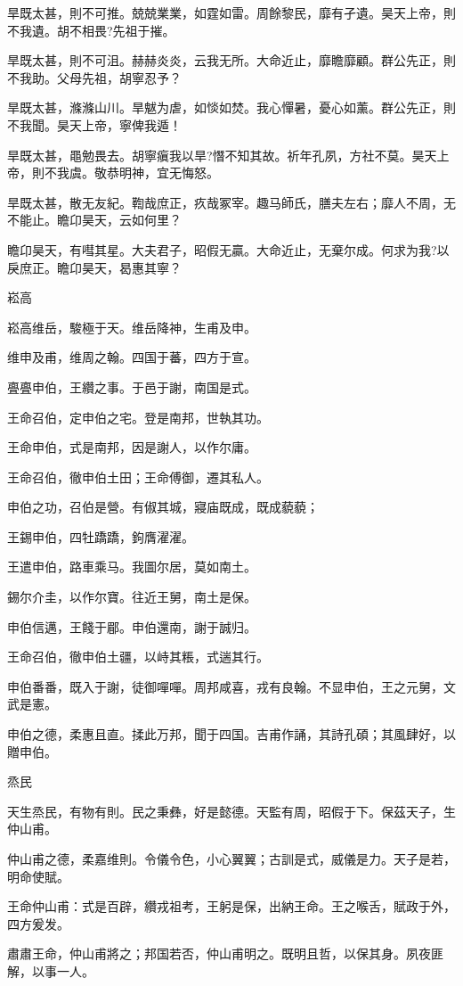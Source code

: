 旱既太甚，則不可推。兢兢業業，如霆如雷。周餘黎民，靡有孑遺。昊天上帝，則不我遺。胡不相畏?先祖于摧。

旱既太甚，則不可沮。赫赫炎炎，云我无所。大命近止，靡瞻靡顧。群公先正，則不我助。父母先祖，胡寧忍予？

旱既太甚，滌滌山川。旱魃为虐，如惔如焚。我心憚暑，憂心如薰。群公先正，則不我聞。昊天上帝，寧俾我遁！

旱既太甚，黽勉畏去。胡寧瘨我以旱?憯不知其故。祈年孔夙，方社不莫。昊天上帝，則不我虞。敬恭明神，宜无悔怒。

旱既太甚，散无友紀。鞫哉庶正，疚哉冢宰。趣马師氏，膳夫左右；靡人不周，无不能止。瞻卬昊天，云如何里？

瞻卬昊天，有嘒其星。大夫君子，昭假无贏。大命近止，无棄尔成。何求为我?以戾庶正。瞻卬昊天，曷惠其寧？

崧高

崧高维岳，駿極于天。维岳降神，生甫及申。

维申及甫，维周之翰。四国于蕃，四方于宣。

亹亹申伯，王纘之事。于邑于謝，南国是式。

王命召伯，定申伯之宅。登是南邦，世執其功。

王命申伯，式是南邦，因是謝人，以作尔庸。

王命召伯，徹申伯土田；王命傅御，遷其私人。

申伯之功，召伯是營。有俶其城，寢庙既成，既成藐藐；

王錫申伯，四牡蹻蹻，鉤膺濯濯。

王遣申伯，路車乘马。我圖尔居，莫如南土。

錫尔介圭，以作尔寶。往近王舅，南土是保。

申伯信邁，王餞于郿。申伯還南，謝于誠归。

王命召伯，徹申伯土疆，以峙其粻，式遄其行。

申伯番番，既入于謝，徒御嘽嘽。周邦咸喜，戎有良翰。不显申伯，王之元舅，文武是憲。

申伯之德，柔惠且直。揉此万邦，聞于四国。吉甫作誦，其詩孔碩；其風肆好，以贈申伯。

烝民

天生烝民，有物有則。民之秉彝，好是懿德。天監有周，昭假于下。保茲天子，生仲山甫。

仲山甫之德，柔嘉维則。令儀令色，小心翼翼；古訓是式，威儀是力。天子是若，明命使賦。

王命仲山甫：式是百辟，纘戎祖考，王躬是保，出納王命。王之喉舌，賦政于外，四方爰发。

肅肅王命，仲山甫將之；邦国若否，仲山甫明之。既明且哲，以保其身。夙夜匪解，以事一人。

